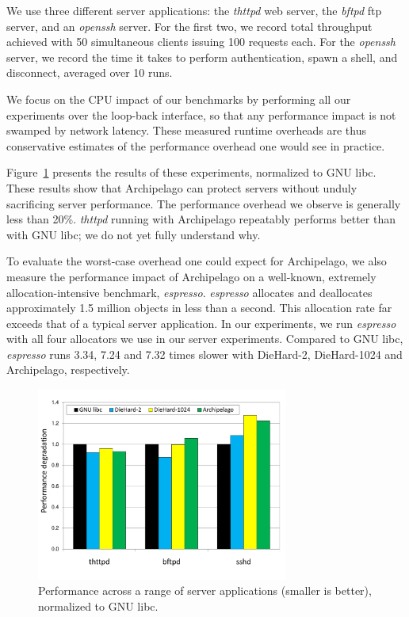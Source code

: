 \documentclass{acm_proc_article-sp}
\begin{document}
We use three different server applications: the \emph{thttpd} web
server, the \emph{bftpd} ftp server, and an \emph{openssh} server. For
the first two, we record total throughput achieved with 50
simultaneous clients issuing 100 requests each. For the \emph{openssh}
server, we record the time it takes to perform authentication, spawn a
shell, and disconnect, averaged over 10 runs.

We focus on the CPU impact of our benchmarks by performing all our
experiments over the loop-back interface, so that any performance
impact is not swamped by network latency. These measured runtime
overheads are thus conservative estimates of the performance
overhead one would see in practice.

Figure~\ref{fig:runtime} presents the results of these experiments,
normalized to GNU libc. These results show that Archipelago can
protect servers without unduly sacrificing server performance. The
performance overhead we observe is generally less than
20\%. \emph{thttpd} running with Archipelago repeatably performs
better than with GNU libc; we do not yet fully understand why.

To evaluate the worst-case overhead one could expect for Archipelago,
we also measure the performance impact of Archipelago on a well-known,
extremely allocation-intensive benchmark,
\emph{espresso}. \emph{espresso} allocates and deallocates approximately 1.5
million objects in less than a second. This allocation rate far
exceeds that of a typical server application. In our experiments, we
run \emph{espresso} with all four allocators we use in our server
experiments. Compared to GNU libc,
\emph{espresso} runs 3.34, 7.24 and 7.32 times slower with DieHard-2,
DieHard-1024 and Archipelago, respectively.


\begin{figure}
 \centering
 \includegraphics[width=3.25in,]{server-perf.pdf}
 \caption{Performance across a range of server applications (smaller is better), normalized to GNU libc.}
 \label{fig:runtime}
\end{figure}
\end{document}

